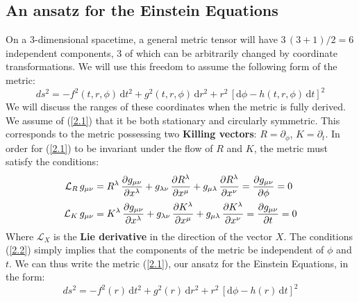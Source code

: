 \subsection{An ansatz for the Einstein Equations}
On a $3$-dimensional spacetime, a general metric tensor will have $3 \, (3 + 1) / 2 = 6$ independent components, $3$ of which can be arbitrarily changed by coordinate transformations. We will use this freedom to assume the following form of the metric: 
%
%
\begin{equation}\label{2.1}
ds^2 = -f^2(t,r,\phi) \, \mathrm{d}t^2
+ g^2(t,r,\phi) \, \mathrm{d}r^2
+ r^2 \, [\mathrm{d}\phi - h(t,r,\phi) \, \mathrm{d}t]^2
\end{equation}
%
%
We will discuss the ranges of these coordinates when the metric is fully derived. We assume of (\ref{2.1}) that it be both stationary and circularly symmetric. This corresponds to the metric possessing two \textbf{Killing vectors}: $R = \partial_{\phi}$, $K = \partial_t$. In order for (\ref{2.1}) to be invariant under the flow of $R$ and $K$, the metric must satisfy the conditions:
%
%
\begin{align}\label{2.2}
\mathcal{L}_{R} \, g_{\mu \nu} & =
R^{\lambda} \, \frac{\partial g_{\mu \nu}}{\partial x^{\lambda}}
+ g_{\lambda \nu} \, \frac{\partial R^{\lambda}}{\partial x^{\mu}}
+ g_{\mu \lambda} \, \frac{\partial R^{\lambda}}{\partial x^{\nu}} =
\frac{\partial g_{\mu \nu}}{\partial \phi} = 0
\notag\\
\mathcal{L}_{K} \, g_{\mu \nu} & =
K^{\lambda} \, \frac{\partial g_{\mu \nu}}{\partial x^{\lambda}}
+ g_{\lambda \nu} \, \frac{\partial K^{\lambda}}{\partial x^{\mu}}
+ g_{\mu \lambda} \, \frac{\partial K^{\lambda}}{\partial x^{\nu}} =
\frac{\partial g_{\mu \nu}}{\partial t} = 0
\end{align}
%
%
Where $\mathcal{L}_{X}$ is the \textbf{Lie derivative} in the direction of the vector $X$. The conditions (\ref{2.2}) simply implies that the components of the metric be independent of $\phi$ and $t$. We can thus write the metric (\ref{2.1}), our ansatz for the Einstein Equations, in the form:
%
%
\begin{equation}\label{2.3}
ds^2 = -f^2(r) \, \mathrm{d}t^2
+ g^2(r) \, \mathrm{d}r^2
+ r^2 \, [\mathrm{d}\phi - h(r) \, \mathrm{d}t]^2
\end{equation}
%
%


